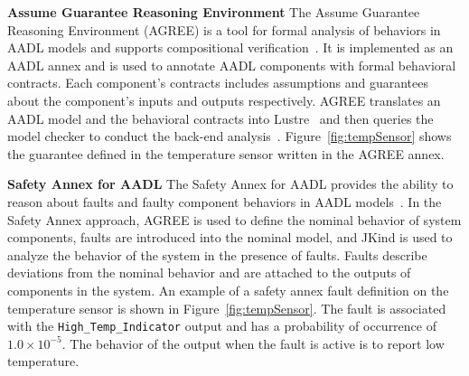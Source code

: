 
\textbf{Assume Guarantee Reasoning Environment}
The Assume Guarantee Reasoning Environment (AGREE) is a tool for formal analysis of behaviors in AADL models and supports compositional verification~\cite{NFM2012:CoGaMiWhLaLu}.  It is implemented as an AADL annex and is used to annotate AADL components with formal behavioral contracts. Each component's contracts includes assumptions and guarantees about the component's inputs and outputs respectively. AGREE translates an AADL model and the behavioral contracts into Lustre~\cite{Halbwachs91:IEEE} and then queries the \jkind model checker to conduct the back-end analysis~\cite{2017arXiv171201222G}. Figure~\ref{fig:tempSensor} shows the guarantee defined in the temperature sensor written in the AGREE annex.


\textbf{Safety Annex for AADL}
The Safety Annex for AADL provides the ability to reason about faults and faulty component behaviors in AADL models~\cite{Stewart17:IMBSA,stewart2020safety}. In the Safety Annex approach, AGREE is used to define the nominal behavior of system components, faults are introduced into the nominal model, and JKind is used to analyze the behavior of the system in the presence of faults. Faults describe deviations from the nominal behavior and are attached to the outputs of components in the system. An example of a safety annex fault definition on the temperature sensor is shown in Figure~\ref{fig:tempSensor}. The fault is associated with the \texttt{High\_Temp\_Indicator} output and has a probability of occurrence of $1.0 \times 10^{-5}$. The behavior of the output when the fault is active is to report low temperature. 